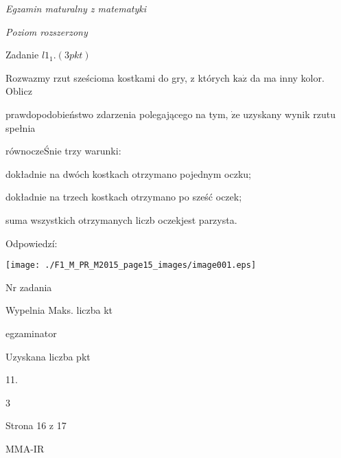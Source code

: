 \documentclass[a4paper,12pt]{article}
\begin{document}
{\it Egzamin maturalny z matematyki}

{\it Poziom rozszerzony}

Zadanie $l1_{1}. (3pkt)$

Rozwazmy rzut sześcioma kostkami do gry, z których $\mathrm{k}\mathrm{a}\dot{\mathrm{z}}$ da ma inny kolor. Oblicz

prawdopodobieństwo zdarzenia polegającego na tym, $\dot{\mathrm{z}}\mathrm{e}$ uzyskany wynik rzutu spełnia

równoczeŚnie trzy warunki:

dokładnie na dwóch kostkach otrzymano pojednym oczku;

dokładnie na trzech kostkach otrzymano po sześć oczek;

suma wszystkich otrzymanych liczb oczekjest parzysta.

Odpowiedzí:
\begin{center}
\texttt{[image: ./F1\_M\_PR\_M2015\_page15\_images/image001.eps]}
\end{center}
Nr zadania

Wypelnia Maks. liczba kt

egzaminator

Uzyskana liczba pkt

11.

3

Strona 16 z 17

MMA-IR
\end{document}
